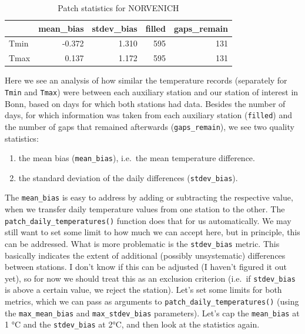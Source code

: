 \documentclass[
]{book}
\providecommand{\tightlist}{%
  \setlength{\itemsep}{0pt}\setlength{\parskip}{0pt}}
\begin{document}
\begin{table}

\caption{\label{tab:unnamed-chunk-13}Patch statistics for NORVENICH}
\fontsize{10}{12}\selectfont
\begin{tabular}[t]{l|r|r|r|r}
\hline
  & mean\_bias & stdev\_bias & filled & gaps\_remain\\
\hline
Tmin & -0.372 & 1.310 & 595 & 131\\
\hline
Tmax & 0.137 & 1.172 & 595 & 131\\
\hline
\end{tabular}
\end{table}

Here we see an analysis of how similar the temperature records (separately for \texttt{Tmin} and \texttt{Tmax}) were between each auxiliary station and our station of interest in Bonn, based on days for which both stations had data. Besides the number of days, for which information was taken from each auxiliary station (\texttt{filled}) and the number of gaps that remained afterwards (\texttt{gaps\_remain}), we see two quality statistics:

\begin{enumerate}
\def\labelenumi{\arabic{enumi})}
\tightlist
\item
  the mean bias (\texttt{mean\_bias}), i.e.~the mean temperature difference.
\item
  the standard deviation of the daily differences (\texttt{stdev\_bias}).
\end{enumerate}

The \texttt{mean\_bias} is easy to address by adding or subtracting the respective value, when we transfer daily temperature values from one station to the other. The \texttt{patch\_daily\_temperatures()} function does that for us automatically. We may still want to set some limit to how much we can accept here, but in principle, this can be addressed. What is more problematic is the \texttt{stdev\_bias} metric. This basically indicates the extent of additional (possibly unsystematic) differences between stations. I don't know if this can be adjusted (I haven't figured it out yet), so for now we should treat this as an exclusion criterion (i.e.~if \texttt{stdev\_bias} is above a certain value, we reject the station). Let's set some limits for both metrics, which we can pass as arguments to \texttt{patch\_daily\_temperatures()} (using the \texttt{max\_mean\_bias} and \texttt{max\_stdev\_bias} parameters). Let's cap the \texttt{mean\_bias} at 1 °C and the \texttt{stdev\_bias} at 2°C, and then look at the statistics again.
\end{document}
